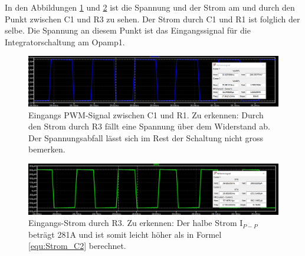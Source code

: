 

In den Abbildungen \ref{fig:Simulation_Rechteck_Spannung} und \ref{fig:Simulation_Rechteck_Strom} ist die Spannung und der Strom am und durch den Punkt zwischen C1 und R3 zu sehen. Der Strom durch C1 und R1 ist folglich der selbe. Die Spannung an diesem Punkt ist das Eingangssignal für die Integratorschaltung am Opamp1.
\begin{figure}[h!]
	\centering
	\includegraphics[width=\textwidth]{graphics/Spannung_Ue_1.png}
	\caption{Eingangs PWM-Signal zwischen C1 und R1. Zu erkennen: Durch den Strom durch R3 fällt eine Spannung über dem Widerstand ab. Der Spannungsabfall lässt sich im Rest der Schaltung nicht gross bemerken.}
	\label{fig:Simulation_Rechteck_Spannung}
\end{figure}

%

\begin{figure}[h!]
	\centering
	\includegraphics[width=\textwidth]{graphics/Strom_Ic1.png}
	\caption{Eingangs-Strom durch R3. Zu erkennen: Der halbe Strom I$_{P-P}$ beträgt 281\textmu A und ist somit leicht höher als in Formel \ref{equ:Strom_C2} berechnet.
	}
	\label{fig:Simulation_Rechteck_Strom}
\end{figure}


